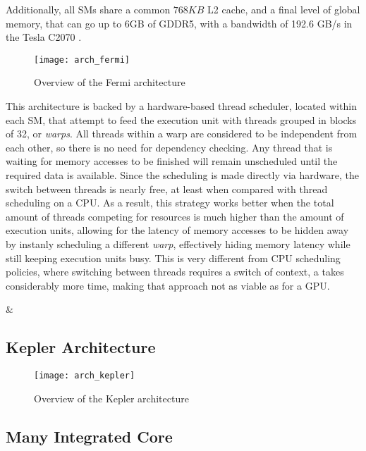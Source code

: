 \documentclass[main.tex]{subfiles}
\begin{document}
Additionally, all \acsp{SM} share a common $768KB$ L2 cache, and a final level of global memory, that can go up to 6GB of GDDR5, with a bandwidth of 192.6 GB/s in the Tesla C2070 \cite{leischner2009fermi}.

\begin{figure}[!htp]
  \centering
  \texttt{[image: arch\_fermi]}
  \caption{Overview of the Fermi architecture \label{fig:fermi}}
\end{figure}

This architecture is backed by a hardware-based thread scheduler, located within each \acs{SM}, that attempt to feed the execution unit with threads grouped in blocks of 32, or \textit{warps}. All threads within a warp are considered to be independent from each other, so there is no need for dependency checking. Any thread that is waiting for memory accesses to be finished will remain unscheduled until the required data is available. Since the scheduling is made directly via hardware, the switch between threads is nearly free, at least when compared with thread scheduling on a \acs{CPU}. As a result, this strategy works better when the total amount of threads competing for resources is much higher than the amount of execution units, allowing for the latency of memory accesses to be hidden away by instanly scheduling a different \textit{warp}, effectively hiding memory latency while still keeping execution units busy. This is very different from \acs{CPU} scheduling policies, where switching between threads requires a switch of context, a takes considerably more time, making that approach not as viable as for a \acs{GPU}.



&%
\subsection{\nvidia Kepler Architecture}

\begin{figure}
  \centering
  \texttt{[image: arch\_kepler]}
  \caption{Overview of the Kepler architecture \label{fig:kepler}}
\end{figure}



\subsection{\intel Many Integrated Core}
\end{document}
